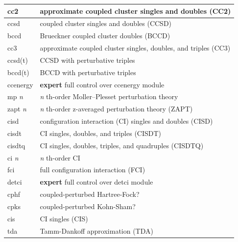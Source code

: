 \documentclass[letterpaper,10pt,english]{sphinxmanual}
\begin{document}
\begin{fulllineitems}
\begin{longtable}{|l|l|}
cc2
 & 
approximate coupled cluster singles and doubles (CC2)
\\\hline

ccsd
 & 
coupled cluster singles and doubles (CCSD)
\\\hline

bccd
 & 
Brueckner coupled cluster doubles (BCCD)
\\\hline

cc3
 & 
approximate coupled cluster singles, doubles, and triples (CC3)
\\\hline

ccsd(t)
 & 
CCSD with perturbative triples
\\\hline

bccd(t)
 & 
BCCD with perturbative triples
\\\hline

ccenergy
 & 
\textbf{expert} full control over ccenergy module
\\\hline

mp \emph{n}
 & 
\emph{n} th-order Moller--Plesset perturbation theory
\\\hline

zapt \emph{n}
 & 
\emph{n} th-order z-averaged perturbation theory (ZAPT)
\\\hline

cisd
 & 
configuration interaction (CI) singles and doubles (CISD)
\\\hline

cisdt
 & 
CI singles, doubles, and triples (CISDT)
\\\hline

cisdtq
 & 
CI singles, doubles, triples, and quadruples (CISDTQ)
\\\hline

ci \emph{n}
 & 
\emph{n} th-order CI
\\\hline

fci
 & 
full configuration interaction (FCI)
\\\hline

detci
 & 
\textbf{expert} full control over detci module
\\\hline

cphf
 & 
coupled-perturbed Hartree-Fock?
\\\hline

cpks
 & 
coupled-perturbed Kohn-Sham?
\\\hline

cis
 & 
CI singles (CIS)
\\\hline

tda
 & 
Tamm-Dankoff approximation (TDA)
\\\hline


\end{longtable}
\end{fulllineitems}
\end{document}
